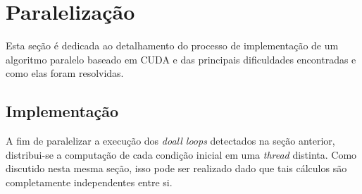 \documentclass[12pt]{article}
\begin{document}

\section {Paralelização}

Esta seção é dedicada ao detalhamento do processo de implementação de um
algoritmo paralelo baseado em CUDA e das principais dificuldades encontradas e
como elas foram resolvidas.

\subsection{Implementação}

A fim de paralelizar a execução dos \textit{doall loops} detectados na seção
anterior, distribui-se a computação de cada condição inicial em uma
\textit{thread} distinta. Como discutido nesta mesma seção, isso pode ser
realizado dado que tais cálculos são completamente independentes entre si.
\end{document}
